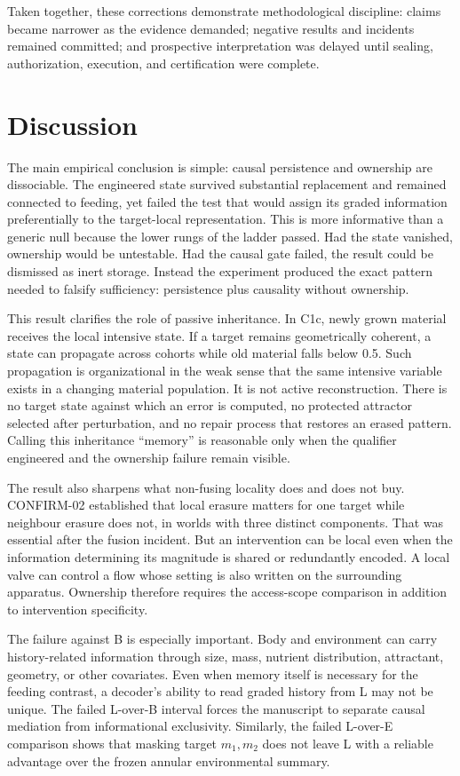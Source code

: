 \documentclass[11pt]{article}
\begin{document}
Taken together, these corrections demonstrate methodological discipline: claims became narrower as the evidence demanded; negative results and incidents remained committed; and prospective interpretation was delayed until sealing, authorization, execution, and certification were complete.

\section{Discussion}

The main empirical conclusion is simple: causal persistence and ownership are dissociable. The engineered state survived substantial replacement and remained connected to feeding, yet failed the test that would assign its graded information preferentially to the target-local representation. This is more informative than a generic null because the lower rungs of the ladder passed. Had the state vanished, ownership would be untestable. Had the causal gate failed, the result could be dismissed as inert storage. Instead the experiment produced the exact pattern needed to falsify sufficiency: persistence plus causality without ownership.

This result clarifies the role of passive inheritance. In C1c, newly grown material receives the local intensive state. If a target remains geometrically coherent, a state can propagate across cohorts while old material falls below 0.5. Such propagation is organizational in the weak sense that the same intensive variable exists in a changing material population. It is not active reconstruction. There is no target state against which an error is computed, no protected attractor selected after perturbation, and no repair process that restores an erased pattern. Calling this inheritance ``memory'' is reasonable only when the qualifier engineered and the ownership failure remain visible.

The result also sharpens what non-fusing locality does and does not buy. CONFIRM-02 established that local erasure matters for one target while neighbour erasure does not, in worlds with three distinct components. That was essential after the fusion incident. But an intervention can be local even when the information determining its magnitude is shared or redundantly encoded. A local valve can control a flow whose setting is also written on the surrounding apparatus. Ownership therefore requires the access-scope comparison in addition to intervention specificity.

The failure against B is especially important. Body and environment can carry history-related information through size, mass, nutrient distribution, attractant, geometry, or other covariates. Even when memory itself is necessary for the feeding contrast, a decoder's ability to read graded history from L may not be unique. The failed L-over-B interval forces the manuscript to separate causal mediation from informational exclusivity. Similarly, the failed L-over-E comparison shows that masking target $m_1,m_2$ does not leave L with a reliable advantage over the frozen annular environmental summary.
\end{document}
